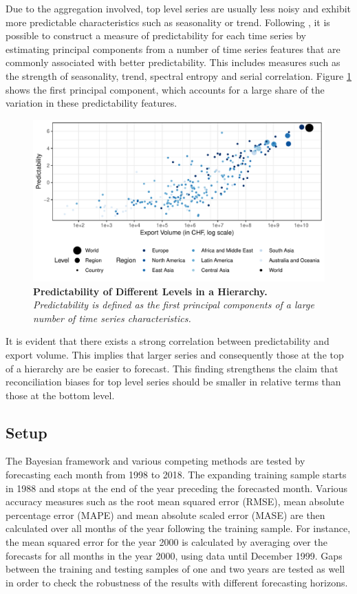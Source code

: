 \documentclass[a4paper,fleqn,11pt]{article}
\begin{document}
Due to the aggregation involved, top level series are usually less noisy and exhibit more predictable characteristics such as seasonality or trend. Following \cite{Kang2017}, it is possible to construct a measure of predictability for each time series by estimating principal components from a number of time series features that are commonly associated with better predictability. This includes measures such as the strength of seasonality, trend, spectral entropy and serial correlation. Figure \ref{fig:feature} shows the first principal component, which accounts for a large share of the variation in these predictability features.
\begin{figure}[H]
	\includegraphics[width=\textwidth]{fig/fig_confetti}
	\caption[Predictability of Different Levels in a Hierarchy]{\textbf{Predictability of Different Levels in a Hierarchy.}\textit{ Predictability is defined as the first principal components of a large number of time series characteristics.}} \label{fig:feature}
\end{figure}
It is evident that there exists a strong correlation between predictability and export volume. This implies that larger series and consequently those at the top of a hierarchy are be easier to forecast. This finding strengthens the claim that reconciliation biases for top level series should be smaller in relative terms than those at the bottom level.\\


\subsection{Setup}
The Bayesian framework and various competing methods are tested by forecasting each month from 1998 to 2018. The expanding training sample starts in 1988 and stops at the end of the year preceding the forecasted month. Various accuracy measures such as the root mean squared error (RMSE), mean absolute percentage error (MAPE) and mean absolute scaled error (MASE) are then calculated over all months of the year following the training sample. For instance, the mean squared error for the year 2000 is calculated by averaging over the forecasts for all months in the year 2000, using data until December 1999. Gaps between the training and testing samples of one and two years are tested as well in order to check the robustness of the results with different forecasting horizons.\\
\end{document}
